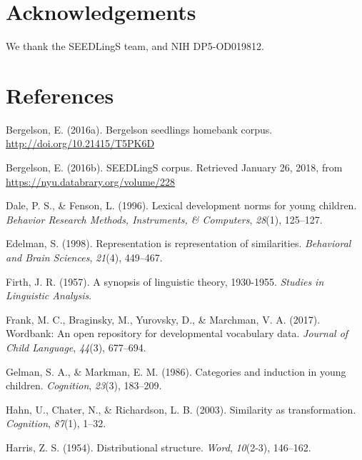 \documentclass[10pt, letterpaper]{article}
\begin{document}
\section{Acknowledgements}\label{acknowledgements}

We thank the SEEDLingS team, and NIH DP5-OD019812.

\section{References}\label{references}

\setlength{\parindent}{-0.1in} \setlength{\leftskip}{0.125in} \noindent

\hypertarget{refs}{}
\hypertarget{ref-bergelson2016seedlings}{}
Bergelson, E. (2016a). Bergelson seedlings homebank corpus.
\url{http://doi.org/10.21415/T5PK6D}

\hypertarget{ref-bergelson2016seedlingsdatabrary}{}
Bergelson, E. (2016b). SEEDLingS corpus. Retrieved January 26, 2018,
from \url{https://nyu.databrary.org/volume/228}

\hypertarget{ref-dale1996lexical}{}
Dale, P. S., \& Fenson, L. (1996). Lexical development norms for young
children. \emph{Behavior Research Methods, Instruments, \& Computers},
\emph{28}(1), 125--127.

\hypertarget{ref-edelman1998representation}{}
Edelman, S. (1998). Representation is representation of similarities.
\emph{Behavioral and Brain Sciences}, \emph{21}(4), 449--467.

\hypertarget{ref-firth1957synopsis}{}
Firth, J. R. (1957). A synopsis of linguistic theory, 1930-1955.
\emph{Studies in Linguistic Analysis}.

\hypertarget{ref-frank2017wordbank}{}
Frank, M. C., Braginsky, M., Yurovsky, D., \& Marchman, V. A. (2017).
Wordbank: An open repository for developmental vocabulary data.
\emph{Journal of Child Language}, \emph{44}(3), 677--694.

\hypertarget{ref-gelman1986categories}{}
Gelman, S. A., \& Markman, E. M. (1986). Categories and induction in
young children. \emph{Cognition}, \emph{23}(3), 183--209.

\hypertarget{ref-hahn2003similarity}{}
Hahn, U., Chater, N., \& Richardson, L. B. (2003). Similarity as
transformation. \emph{Cognition}, \emph{87}(1), 1--32.

\hypertarget{ref-harris1954distributional}{}
Harris, Z. S. (1954). Distributional structure. \emph{Word},
\emph{10}(2-3), 146--162.
\end{document}

